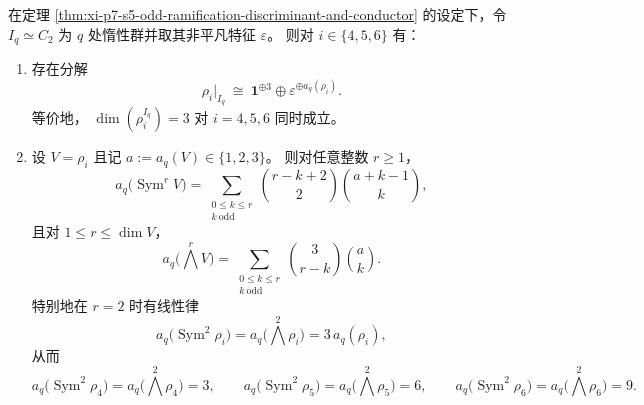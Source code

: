 \begin{theorem}\label{thm:xi-p7-s5-q-inertia-vacuum3-schur-functor-conductors}
在定理 \ref{thm:xi-p7-s5-odd-ramification-discriminant-and-conductor} 的设定下，令 \(I_q\simeq C_2\) 为 \(q\) 处惰性群并取其非平凡特征 \(\varepsilon\)。
则对 \(i\in\{4,5,6\}\) 有：
\begin{enumerate}
  \item 存在分解
  \[
  \rho_i\big|_{I_q}\ \cong\ \mathbf 1^{\oplus 3}\oplus \varepsilon^{\oplus a_q(\rho_i)}.
  \]
  等价地，
  \(
  \dim(\rho_i^{I_q})=3
  \)
  对 \(i=4,5,6\) 同时成立。
  \item 设 \(V=\rho_i\) 且记 \(a:=a_q(V)\in\{1,2,3\}\)。
  则对任意整数 \(r\ge 1\)，
  \begin{equation}\label{eq:xi-p7-q-schur-symr-conductor-closed}
  a_q\!\bigl(\operatorname{Sym}^{r}V\bigr)
  =\sum_{\substack{0\le k\le r\\ k\ \mathrm{odd}}}
  \binom{r-k+2}{2}\binom{a+k-1}{k},
  \end{equation}
  且对 \(1\le r\le \dim V\)，
  \begin{equation}\label{eq:xi-p7-q-schur-wedger-conductor-closed}
  a_q\!\bigl(\bigwedge^{r}V\bigr)
  =\sum_{\substack{0\le k\le r\\ k\ \mathrm{odd}}}
  \binom{3}{r-k}\binom{a}{k}.
  \end{equation}
  特别地在 \(r=2\) 时有线性律
  \[
  a_q\!\bigl(\operatorname{Sym}^{2}\rho_i\bigr)
  =a_q\!\bigl(\bigwedge^{2}\rho_i\bigr)
  =3\,a_q(\rho_i),
  \]
  从而
  \[
  a_q\!\bigl(\operatorname{Sym}^{2}\rho_4\bigr)=a_q\!\bigl(\bigwedge^{2}\rho_4\bigr)=3,\qquad
  a_q\!\bigl(\operatorname{Sym}^{2}\rho_5\bigr)=a_q\!\bigl(\bigwedge^{2}\rho_5\bigr)=6,\qquad
  a_q\!\bigl(\operatorname{Sym}^{2}\rho_6\bigr)=a_q\!\bigl(\bigwedge^{2}\rho_6\bigr)=9.
  \]
\end{enumerate}
\end{theorem}

